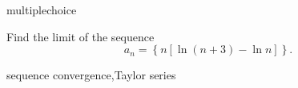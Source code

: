 \documentclass{ximera}
\begin{document}
\begin{question}[2017C.10]
\begin{type}
multiplechoice
\end{type}
Find the limit of the sequence
\[ a_n = \left\{ n \left[ \ln (n+3) - \ln n \right] \right\}. \]
\begin{multiplechoice}
\choice{\(\infty\)}
\end{multiplechoice}
\begin{keywords}
sequence convergence,Taylor series
\end{keywords}
\end{question}
\end{document}
